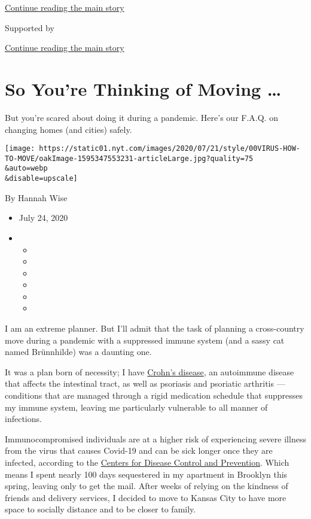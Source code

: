 \protect\hyperlink{after-top}{Continue reading the main story}

Supported by

\protect\hyperlink{after-sponsor}{Continue reading the main story}

\hypertarget{so-youre-thinking-of-moving-}{%
\section{So You're Thinking of Moving
\ldots{}}\label{so-youre-thinking-of-moving-}}

But you're scared about doing it during a pandemic. Here's our F.A.Q. on
changing homes (and cities) safely.

\texttt{[image: https://static01.nyt.com/images/2020/07/21/style/00VIRUS-HOW-TO-MOVE/oakImage-1595347553231-articleLarge.jpg?quality=75\\\&auto=webp\\\&disable=upscale]}

By Hannah Wise

\begin{itemize}
\item
  July 24, 2020
\item
  \begin{itemize}
  \item
  \item
  \item
  \item
  \item
  \item
  \end{itemize}
\end{itemize}

I am an extreme planner. But I'll admit that the task of planning a
cross-country move during a pandemic with a suppressed immune system
(and a sassy cat named Brünnhilde) was a daunting one.

It was a plan born of necessity; I have
\href{https://www.dallasnews.com/news/healthy-living/2016/05/10/how-a-diagnosis-of-crohn-s-disease-changed-me-at-23/}{Crohn's
disease}, an autoimmune disease that affects the intestinal tract, as
well as psoriasis and psoriatic arthritis --- conditions that are
managed through a rigid medication schedule that suppresses my immune
system, leaving me particularly vulnerable to all manner of infections.

Immunocompromised individuals are at a higher risk of experiencing
severe illness from the virus that causes Covid-19 and can be sick
longer once they are infected, according to the
\href{https://www.cdc.gov/coronavirus/2019-ncov/need-extra-precautions/immunocompromised.html}{Centers
for Disease Control and Prevention}. Which means I spent nearly 100 days
sequestered in my apartment in Brooklyn this spring, leaving only to get
the mail. After weeks of relying on the kindness of friends and delivery
services, I decided to move to Kansas City to have more space to
socially distance and to be closer to family.

